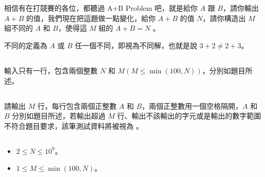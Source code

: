 


\section*{}
\subsection*{}

相信有在打競賽的各位，都聽過 A+B Problem 吧，就是給你 $A$ 跟 $B$，請你輸出 $A + B$ 的值，我們現在把這題做一點變化，給你 $A + B$ 的值 $N$，請你構造出 $M$ 組不同的 $A$ 和 $B$，使得這 $M$ 組的 $A+B=N$ 。

不同的定義為 $A$ 或 $B$ 任一個不同，即視為不同解，也就是說 $3 + 2 \ne 2 + 3$。


\subsection*{}
輸入只有一行，包含兩個整數 $N$ 和 $M(M \le \min(100, N))$，分別如題目所述。

\subsection*{}
請輸出 $M$ 行，每行包含兩個正整數 $A$ 和 $B$，兩個正整數用一個空格隔開，$A$ 和 $B$ 分別如題目所述，若輸出超過 $M$ 行、輸出不該輸出的字元或是輸出的數字範圍不符合題目要求，該筆測試資料將被視為 。

\subsection*{}
\begin{itemize}
    \item $2\le N \le 10^9$。
    \item $1\le M \le \min(100, N)$。
\end{itemize}

\subsection*{}
{
\setlength\parindent{0pt}
}
\subsection*{}
{
\setlength\parindent{0pt}
}
